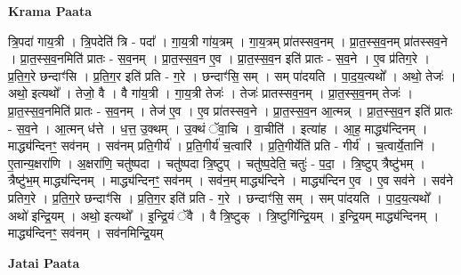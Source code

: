 \documentclass[17pt]{extarticle}
\begin{document}
\textbf{Krama Paata} \newline

त्रि॒पदा॑ गाय॒त्री । त्रि॒पदेति॑ त्रि - पदा᳚ । गा॒य॒त्री गा॑य॒त्रम् । गा॒य॒त्रम् प्रा॑तस्सव॒नम् । प्रा॒त॒स्स॒व॒नम् प्रा॑तस्सव॒ने । प्रा॒त॒स्स॒व॒नमिति॑ प्रातः - स॒व॒नम् । प्रा॒त॒स्स॒व॒न ए॒व । प्रा॒त॒स्स॒व॒न इति॑ प्रातः - स॒व॒ने । ए॒व प्र॑तिग॒रे । प्र॒ति॒ग॒रे छन्दाꣳ॑सि । प्र॒ति॒ग॒र इति॑ प्रति - ग॒रे । छन्दाꣳ॑सि॒ सम् । सम् पा॑दयति । पा॒द॒य॒त्यथो᳚ । अथो॒ तेजः॑ । अथो॒ इत्यथो᳚ । तेजो॒ वै । वै गा॑य॒त्री । गा॒य॒त्री तेजः॑ । तेजः॑ प्रातस्सव॒नम् । प्रा॒त॒स्स॒व॒नम् तेजः॑ । प्रा॒त॒स्स॒व॒नमिति॑ प्रातः - स॒व॒नम् । तेज॑ ए॒व । ए॒व प्रा॑तस्सव॒ने । प्रा॒त॒स्स॒व॒न आ॒त्मन्न् । प्रा॒त॒स्स॒व॒न इति॑ प्रातः - स॒व॒ने । आ॒त्मन् ध॑त्ते । ध॒त्त॒ उ॒क्थम् । उ॒क्थं ॅवा॒चि । वा॒चीति॑ । इत्या॑ह । आ॒ह॒ माद्ध्य॑न्दिनम् । माद्ध्य॑न्दिनꣳ॒॒ सव॑नम् । सव॑नम् प्रति॒गीर्य॑ । प्र॒ति॒गीर्य॑ च॒त्वारि॑ । प्र॒ति॒गीर्येति॑ प्रति - गीर्य॑ । च॒त्वार्ये॒तानि॑ । ए॒तान्य॒क्षरा॑णि । अ॒क्षरा॑णि॒ चतु॑ष्पदा । चतु॑ष्पदा त्रि॒ष्टुप् । चतु॑ष्प॒देति॒ चतुः॑ - प॒दा॒ । त्रि॒ष्टुप् त्रैष्टु॑भम् । त्रैष्टु॑भ॒म् माद्ध्य॑न्दिनम् । माद्ध्य॑न्दिनꣳ॒॒ सव॑नम् । सव॑न॒म् माद्ध्य॑न्दिने । माद्ध्य॑न्दिन ए॒व । ए॒व सव॑ने । सव॑ने प्रतिग॒रे । प्र॒ति॒ग॒रे छन्दाꣳ॑सि । प्र॒ति॒ग॒र इति॑ प्रति - ग॒रे । छन्दाꣳ॑सि॒ सम् । सम् पा॑दयति । पा॒द॒य॒त्यथो᳚ । अथो॑ इन्द्रि॒यम् । अथो॒ इत्यथो᳚ । इ॒न्द्रि॒यं ॅवै । वै त्रि॒ष्टुक् । त्रि॒ष्टुगि॑न्द्रि॒यम् । इ॒न्द्रि॒यम् माद्ध्य॑न्दिनम् । माद्ध्य॑न्दिनꣳ॒॒ सव॑नम् । सव॑नमिन्द्रि॒यम् \newline

\textbf{Jatai Paata} \newline
\end{document}
